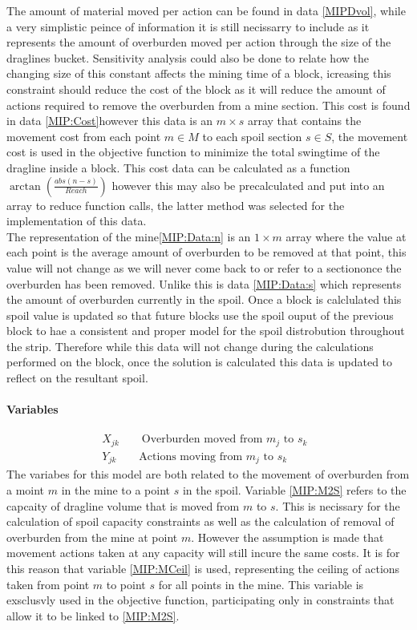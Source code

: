 The amount of material moved per action can be found in data \ref{MIPDvol}, while a very simplistic peince of information it is still necissarry to include as it represents the amount of overburden moved per action through the size of the draglines bucket. Sensitivity analysis could also be done to relate how the changing size of this constant affects the mining time of a block, icreasing this constraint should reduce the cost of the block as it will reduce the amount of actions required to remove the overburden from a mine section. This cost is found in data \ref{MIP:Cost}however this data is an $m\times s$ array that contains the movement cost from each point $m\in M$ to each spoil section $s \in S$, the movement cost is used in the objective function to minimize the total swingtime of the dragline inside a block. This cost data can be calculated as a function $\arctan(\frac{abs(n-s)}{Reach})$ however this may also be precalculated and put into an array to reduce function calls, the latter method was selected for the implementation of this data. 
\\
The representation of the mine\ref{MIP:Data:n} is an $1\times m$ array where the value at each point is the average amount of overburden to be removed at that point, this value will not change as we will never come back to or refer to a sectiononce the overburden has been removed. Unlike this is data \ref{MIP:Data:s} which represents the amount of overburden currently in the spoil. Once a block is calclulated this spoil value is updated so that future blocks use the spoil ouput of the previous block to hae a consistent and proper model for the spoil distrobution throughout the strip. Therefore while this data will not change during the calculations performed on the block, once the solution is calculated this data is updated to reflect on the resultant spoil. 
\paragraph*{Variables}
\begin{align}
\label{MIP:M2S}
X_{jk} \qquad \text{Overburden moved from $m_{j}$ to $s_k$ }\\
\label{MIP:MCeil}
Y_{jk} \qquad \text{Actions moving from $m_{j}$ to $s_k$ }
\end{align}
The variabes for this model are both related to the movement of overburden from a moint $m$ in the mine to a point $s$ in the spoil. Variable \ref{MIP:M2S} refers to the capcaity of dragline volume that is moved from $m$ to $s$. This is necissary for the calculation of spoil capacity constraints as well as the calculation of removal of overburden from the mine at point $m$. However the assumption is made that movement actions taken at any capacity will still incure the same costs. It is for this reason that variable \ref{MIP:MCeil} is used, representing the ceiling of actions taken from point $m$ to point $s$ for all points in the mine. This variable is exsclusvly used in the objective function, participating only in constraints that allow it to be linked to \ref{MIP:M2S}.
